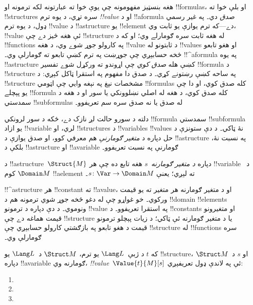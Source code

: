 \documentclass[../../../include/open-logic-section]{subfiles}
\begin{document}


\begin{explain}
هغه بنسټيز مفهومونه چې يوې خوا ته عبارتونه لکه ترمونه او
!!{formula}s، او بلې خوا ته !!{structure}s سره تړي، د يوه ترم
\emph{!!{value}} او د !!a{formula} \emph{صدق} دي۔ په غير رسمي ډول،
د يوه ترم !!{value} د !!a{structure} يو !!{element} دے---که ترم
يوازې يو ثابت وي، !!{value} ئې هغه څيز دے چې !!{structure} له هغه
ثابت سره ګومارلے وي؛ او که د !!{function}s په کارولو جوړ شوے وي، د
هغه !!{value} د ثابتونو له !!{value}s او هغو تابعو څخه حسابېږي چې
جوړښت په ترم کښې تابعو ته ګومارلې وي۔ !!^a{formula} په يوه
!!a{structure} کښې هله \emph{صدق کوي} چې اړوندو ته ورکړل شوے تفسير
!!{formula} د !!{structure} په ساحه کښې رښتونے کړي۔ د صدق دا مفهوم په
استقرا ټاکل کېږي: د !!{structure} مشخصات نېغ په نېغه وايي چې اټومي
!!{formula}s کله صدق کوي، او دا چې يو پېچلے !!{formula} کله صدق کوي،
د هغه له اصلي نښلوونکي يا سور او د هغه د سمدستي !!{subformula}s له
صدق يا نه صدق سره سم تعريفوو۔

دلته د سورو حالت لږ نازک دے، ځکه د سور لرونکي !!{formula} سمدستي
!!{subformula} يو ازاد !!{variable} لري، او !!{structure}s د
!!{variable}s !!{value}s نۀ ټاکي۔ د دې ستونزې د حل دپاره د
\emph{متغير ګومارنې} هم معرفي کوو، او صدق يوازې د
!!a{structure} په نسبت نۀ، بلکې د !!a{structure} او !!a{variable}
ګومارنې په نسبت تعريفوو۔
\end{explain}

\begin{defn}
د !!a{structure}~$\Struct{M}$ دپاره \emph{د متغير ګومارنه}~$s$ هغه
تابع ده چې هر !!{variable} د~$\Domain M$ کوم !!a{element} ته لېږي؛
يعنې $s\colon \Var \to \Domain M$۔
\end{defn}

\begin{explain}
!!^a{structure} هر !!{constant} ته !!a{value}، او د متغير ګومارنه
هر متغير ته يو قيمت ورکوي۔ خو غواړو چې له دغو څخه جوړ شوي ترمونه هم
د !!{domain} !!{element}s ونوموي۔ د دې دپاره د ترمونو !!{value} په
استقرا تعريفوو۔ د !!{constant}s او متغيرونو قيمت هماغه دے چې
!!{structure} يا د متغير ګومارنه ئې ټاکي؛ د زيات پېچلو ترمونو قيمت
د هغو تابعو په بازګشتي کارولو حسابېږي چې !!{structure} له
!!{function}s سره ګومارلې وي۔
\end{explain}

\begin{defn}
که $t$ د ژبې~$\Lang L$ يو ترم، $\Struct M$ د~$\Lang L$ يو
!!{structure}، او $s$ د~$\Struct M$ دپاره !!a{variable} ګومارنه وي،
\emph{!!{value}}~$\Value{t}{M}[s]$ ئې په لاندې ډول تعريفېږي:
\begin{enumerate}
\item {}
\item {}
\item {}
\end{enumerate}
\end{defn}
\end{document}
